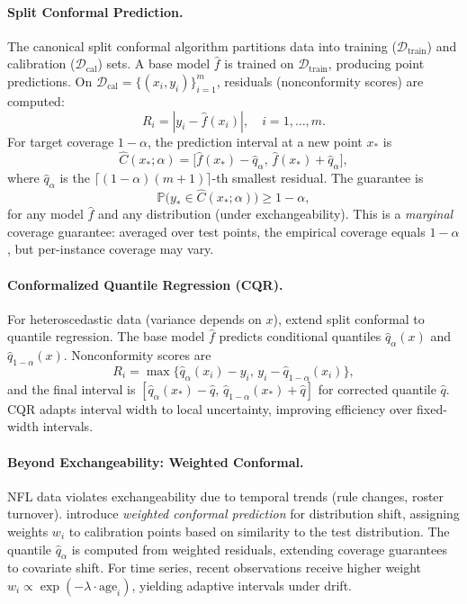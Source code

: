 \paragraph{Split Conformal Prediction.}
The canonical split conformal algorithm \citep{lei2018conformal} partitions data into training ($\mathcal{D}_{\text{train}}$) and calibration ($\mathcal{D}_{\text{cal}}$) sets. A base model $\hat{f}$ is trained on $\mathcal{D}_{\text{train}}$, producing point predictions. On $\mathcal{D}_{\text{cal}}=\{(x_i, y_i)\}_{i=1}^m$, residuals (nonconformity scores) are computed:
\begin{equation}
R_i = |y_i - \hat{f}(x_i)|, \quad i=1,\dots,m.
\end{equation}
For target coverage $1-\alpha$, the prediction interval at a new point $x_*$ is
\begin{equation}\label{eq:split-conformal}
\hat{C}(x_*; \alpha) = \big[\hat{f}(x_*) - \hat{q}_\alpha, \, \hat{f}(x_*) + \hat{q}_\alpha\big],
\end{equation}
where $\hat{q}_\alpha$ is the $\lceil (1-\alpha)(m+1) \rceil$-th smallest residual. The guarantee is
\begin{equation}\label{eq:conformal-guarantee}
\mathbb{P}\big(y_* \in \hat{C}(x_*; \alpha)\big) \ge 1-\alpha,
\end{equation}
for any model $\hat{f}$ and any distribution (under exchangeability). This is a \emph{marginal} coverage guarantee: averaged over test points, the empirical coverage equals $1-\alpha$, but per-instance coverage may vary.

\paragraph{Conformalized Quantile Regression (CQR).}
For heteroscedastic data (variance depends on $x$), \citet{romano2019cqr} extend split conformal to quantile regression. The base model $\hat{f}$ predicts conditional quantiles $\hat{q}_\alpha(x)$ and $\hat{q}_{1-\alpha}(x)$. Nonconformity scores are
\begin{equation}
R_i = \max\Big\{\hat{q}_\alpha(x_i) - y_i,\, y_i - \hat{q}_{1-\alpha}(x_i)\Big\},
\end{equation}
and the final interval is $[\hat{q}_\alpha(x_*)-\hat{q}, \, \hat{q}_{1-\alpha}(x_*)+\hat{q}]$ for corrected quantile $\hat{q}$. CQR adapts interval width to local uncertainty, improving efficiency over fixed-width intervals.

\paragraph{Beyond Exchangeability: Weighted Conformal.}
NFL data violates exchangeability due to temporal trends (rule changes, roster turnover). \citet{barber2023conformal} introduce \emph{weighted conformal prediction} for distribution shift, assigning weights $w_i$ to calibration points based on similarity to the test distribution. The quantile $\hat{q}_\alpha$ is computed from weighted residuals, extending coverage guarantees to covariate shift. For time series, recent observations receive higher weight $w_i \propto \exp(-\lambda \cdot \text{age}_i)$, yielding adaptive intervals under drift.

